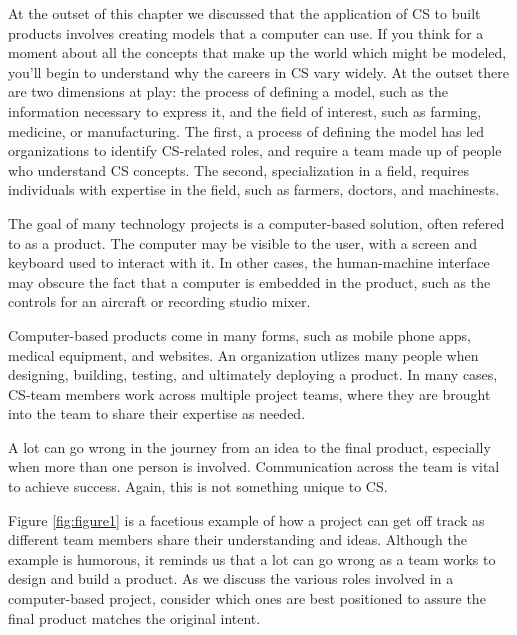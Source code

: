 At the outset of this chapter we discussed that the application of CS to built products involves creating models that a computer can use. If you think for a moment about all the concepts that make up the world which might be modeled, you'll begin to understand why the careers in CS vary widely. At the outset there are two dimensions at play: the process of defining a model, such as the information necessary to express it, and the field of interest, such as farming, medicine, or manufacturing. The first, a process of defining the model has led organizations to identify CS-related roles, and require a team made up of people who understand CS concepts. The second, specialization in a field, requires individuals with expertise in the field, such as farmers, doctors, and machinests.

The goal of many technology projects is a computer-based solution, often refered to as a product. The computer may be visible to the user, with a screen and keyboard used to interact with it. In other cases, the human-machine interface may obscure the fact that a computer is embedded in the product, such as the controls for an aircraft or recording studio mixer.

Computer-based products come in many forms, such as mobile phone apps, medical equipment, and websites. An organization utlizes many people when designing, building, testing, and ultimately deploying a product. In many cases, CS-team members work across multiple project teams, where they are brought into the team to share their expertise as needed. 

A lot can go wrong in the journey from an idea to the final product, especially when more than one person is involved. Communication across the team is vital to achieve success. Again, this is not something unique to CS. 

Figure \ref{fig:figure1} is a facetious example of how a project can get off track as different team members share their understanding and ideas. Although the example is humorous, it reminds us that a lot can go wrong as a team works to design and build a product. As we discuss the various roles involved in a computer-based project, consider which ones are best positioned to assure the final product matches the original intent.

